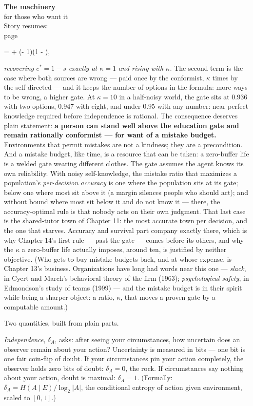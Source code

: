 \begin{machinery}{\textbf{The machinery}\\for those who want it\\[3pt]{\color{muted}Story resumes:\\page~\pageref{ch6}}}
\begin{dispmath} \;=\;  + (\kappa - 1)\Bigl(1 - \Bigr),\end{dispmath}

\noindent \emph{recovering \(e^{\ast} = 1-s\) exactly at \(\kappa = 1\) and rising with \(\kappa\).} The second
term is the case where both sources are wrong --- paid once by the
conformist, \(\kappa\) times by the self-directed --- and it keeps the number of
options in the formula: more ways to be wrong, a higher gate. At \(\kappa = 10\) in a half-noisy world, the gate sits at 0.936
with two options, 0.947 with eight, and under 0.95 with any number:
near-perfect knowledge required before independence is rational. The consequence deserves
plain statement: \textbf{a person can stand well above the education gate
and remain rationally conformist --- for want of a mistake budget.}
Environments that permit mistakes are not a kindness; they are a
precondition. And a mistake budget, like time, is a resource that can
be taken: a zero-buffer life is a welded gate wearing different
clothes. The gate assumes
the agent knows its own reliability. With noisy self-knowledge, the
mistake ratio that maximizes a population's \emph{per-decision accuracy} is
one where the population sits at its gate; below one where most sit
above it (a margin silences people who should act); and without bound
where most sit below it and do not know it --- there, the
accuracy-optimal rule is that nobody acts on their own judgment. That
last case is the shared-tutor town of Chapter 11: the most accurate
town per decision, and the one that starves. Accuracy and survival
part company exactly there, which is why Chapter 14's first rule ---
past the gate --- comes before its others, and why the \(\kappa\) a zero-buffer
life actually imposes, around ten, is justified by neither objective.
(Who gets to buy mistake budgets back, and at whose expense,
is Chapter 13's business. Organizations have long had words near this one --- \emph{slack}, in Cyert and March's behavioral theory of the firm (1963); \emph{psychological safety}, in Edmondson's study of teams (1999) --- and the mistake budget is in their spirit while being a sharper object: a ratio, \(\kappa\), that moves a proven gate by a computable amount.)


Two quantities, built from plain parts.

\emph{Independence}, \(\delta_A\), asks: after seeing your circumstances, how
uncertain does an observer remain about your action? Uncertainty is
measured in bits --- one bit is one fair coin-flip of doubt. If your
circumstances pin your action completely, the observer holds zero bits
of doubt: \(\delta_A = 0\), the rock. If circumstances say nothing about your
action, doubt is maximal: \(\delta_A = 1\). (Formally: \(\delta_A = H(A \mid E)/\log_2 |A|\), the conditional entropy of action given environment, scaled to \([0,1]\).)


\end{machinery}
